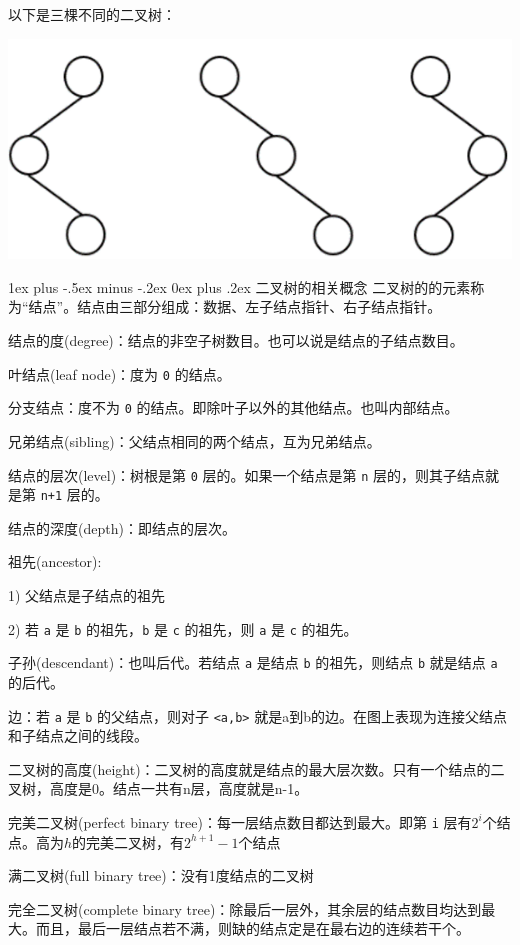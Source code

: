 \documentclass[10pt,UTF8,a4paper]{ctexart}
\makeatletter
\renewcommand{\subsubsection}{\@startsection{subsubsection}{3}{0mm}%
                                {1ex plus -.5ex minus -.2ex}%
                                {0ex plus .2ex}%
                                {\normalfont\small\bfseries}}
\makeatother
\begin{document}
\begin{multicols}{3}
以下是三棵不同的二叉树：

\includegraphics[width=.5\columnwidth]{images/三颗不同二叉树.png}

\subsubsection{二叉树的相关概念}
二叉树的的元素称为“结点”。结点由三部分组成：数据、左子结点指针、右子结点指针。

结点的度(degree)：结点的非空子树数目。也可以说是结点的子结点数目。

叶结点(leaf node)：度为 \verb|0| 的结点。

分支结点：度不为 \verb|0| 的结点。即除叶子以外的其他结点。也叫内部结点。

兄弟结点(sibling)：父结点相同的两个结点，互为兄弟结点。

结点的层次(level)：树根是第 \verb|0| 层的。如果一个结点是第 \verb|n| 层的，则其子结点就是第 \verb|n+1| 层的。

结点的深度(depth)：即结点的层次。

祖先(ancestor):

	1)	父结点是子结点的祖先

	2)	若 \verb|a| 是 \verb|b| 的祖先，\verb|b| 是 \verb|c| 的祖先，则 \verb|a| 是 \verb|c| 的祖先。

子孙(descendant)：也叫后代。若结点 \verb|a| 是结点 \verb|b| 的祖先，则结点 \verb|b| 就是结点 \verb|a| 的后代。

边：若 \verb|a| 是 \verb|b| 的父结点，则对子 \verb|<a,b>| 就是a到b的边。在图上表现为连接父结点和子结点之间的线段。

二叉树的高度(height)：二叉树的高度就是结点的最大层次数。只有一个结点的二叉树，高度是0。结点一共有n层，高度就是n-1。

完美二叉树(perfect binary tree)：每一层结点数目都达到最大。即第 \verb|i| 层有$2^i$个结点。高为$h$的完美二叉树，有$2^{h+1} -1$个结点

满二叉树(full binary tree)：没有1度结点的二叉树

完全二叉树(complete binary tree)：除最后一层外，其余层的结点数目均达到最大。而且，最后一层结点若不满，则缺的结点定是在最右边的连续若干个。


\end{multicols}
\end{document}
